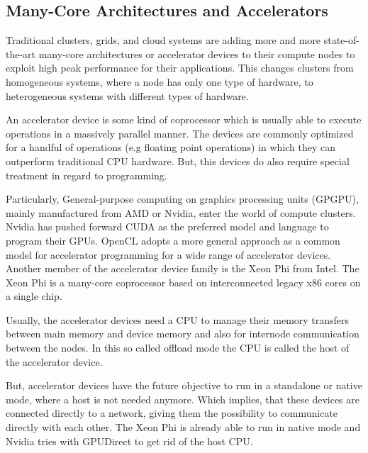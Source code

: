 \subsection{Many-Core Architectures and Accelerators}
\label{sec:accel}

Traditional clusters, grids, and cloud systems are adding more and
more state-of-the-art many-core architectures or accelerator devices
to their compute nodes to exploit high peak performance for their
applications. This changes clusters from homogeneous systems, where a
node has only one type of hardware, to heterogeneous systems with
different types of hardware.

An accelerator device is some kind of coprocessor which is usually
able to execute operations in a massively parallel manner.  The
devices are commonly optimized for a handful of operations (e.g
floating point operations) in which they can outperform traditional
CPU hardware. But, this devices do also require special treatment in
regard to programming.

Particularly, General-purpose computing on graphics processing units
(GPGPU), mainly manufactured from AMD or Nvidia, enter the world of
compute clusters. Nvidia has pushed forward CUDA\cite{ref:cuda} as the
preferred model and language to program their
GPUs. OpenCL\cite{ref:opencl} adopts a more general approach as a
common model for accelerator programming for a wide range of
accelerator devices. Another member of the accelerator device family
is the Xeon Phi\cite{ref:xeon_phi} from Intel. The Xeon Phi is a
many-core coprocessor based on interconnected legacy x86 cores on a
single chip.

Usually, the accelerator devices need a CPU to manage their memory
transfers between main memory and device memory and also for internode
communication between the nodes. In this so called offload mode the
CPU is called the host of the accelerator device.

But, accelerator devices have the future objective to run in a
standalone or native mode, where a host is not needed anymore.  Which
implies, that these devices are connected directly to a network,
giving them the possibility to communicate directly with each
other. The Xeon Phi is already able to run in native mode and Nvidia
tries with GPUDirect to get rid of the host CPU.

